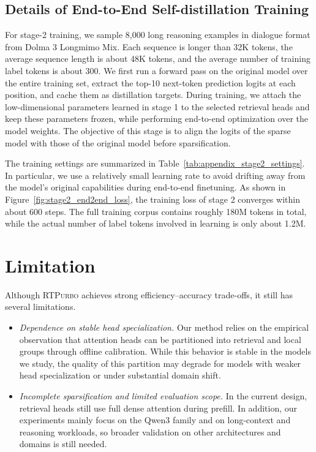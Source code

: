 \documentclass{llmxive}
\providecommand{\name}{{\textsc{RTPurbo}}\xspace}
\begin{document}
\subsection{Details of End-to-End Self-distillation Training}
\label{appd:train_stage_2}

For stage-2 training, we sample 8,000 long reasoning examples in dialogue format from Dolma 3 Longmimo Mix. Each sequence is longer than 32K tokens, the average sequence length is about 48K tokens, and the average number of training label tokens is about 300. We first run a forward pass on the original model over the entire training set, extract the top-10 next-token prediction logits at each position, and cache them as distillation targets. During training, we attach the low-dimensional parameters learned in stage 1 to the selected retrieval heads and keep these parameters frozen, while performing end-to-end optimization over the model weights. The objective of this stage is to align the logits of the sparse model with those of the original model before sparsification.

The training settings are summarized in Table~\ref{tab:appendix_stage2_settings}. In particular, we use a relatively small learning rate to avoid drifting away from the model's original capabilities during end-to-end finetuning. As shown in Figure~\ref{fig:stage2_end2end_loss}, the training loss of stage 2 converges within about 600 steps. The full training corpus contains roughly 180M tokens in total, while the actual number of label tokens involved in learning is only about 1.2M.


\section{Limitation} \label{appd:limitation}

Although \name achieves strong efficiency--accuracy trade-offs, it still has several limitations.

\begin{itemize}[leftmargin=*, itemindent=0pt]
    \item \emph{Dependence on stable head specialization.} Our method relies on the empirical observation that attention heads can be partitioned into retrieval and local groups through offline calibration. While this behavior is stable in the models we study, the quality of this partition may degrade for models with weaker head specialization or under substantial domain shift.

    \item \emph{Incomplete sparsification and limited evaluation scope.} In the current design, retrieval heads still use full dense attention during prefill. In addition, our experiments mainly focus on the Qwen3 family and on long-context and reasoning workloads, so broader validation on other architectures and domains is still needed.
\end{itemize}
\end{document}
